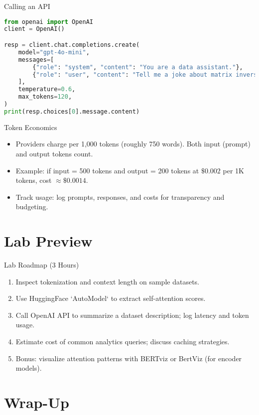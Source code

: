 \documentclass[aspectratio=169]{beamer}
\begin{document}
\begin{frame}[fragile]{Calling an API}
  \begin{lstlisting}[language=Python]
from openai import OpenAI
client = OpenAI()

resp = client.chat.completions.create(
    model="gpt-4o-mini",
    messages=[
        {"role": "system", "content": "You are a data assistant."},
        {"role": "user", "content": "Tell me a joke about matrix inversion."}
    ],
    temperature=0.6,
    max_tokens=120,
)
print(resp.choices[0].message.content)
  \end{lstlisting}
\end{frame}

\begin{frame}{Token Economics}
  \begin{itemize}
    \item Providers charge per 1,000 tokens (roughly 750 words). Both input (prompt) and output tokens count.
    \item Example: if input = 500 tokens and output = 200 tokens at $\$0.002$ per 1K tokens, cost $\approx \$0.0014$.
    \item Track usage: log prompts, responses, and costs for transparency and budgeting.
  \end{itemize}
\end{frame}

\section{Lab Preview}

\begin{frame}{Lab Roadmap (3 Hours)}
  \begin{enumerate}
    \item Inspect tokenization and context length on sample datasets.
    \item Use HuggingFace `AutoModel` to extract self-attention scores.
    \item Call OpenAI API to summarize a dataset description; log latency and token usage.
    \item Estimate cost of common analytics queries; discuss caching strategies.
    \item Bonus: visualize attention patterns with BERTviz or BertViz (for encoder models).
  \end{enumerate}
\end{frame}

\section{Wrap-Up}
\end{document}

